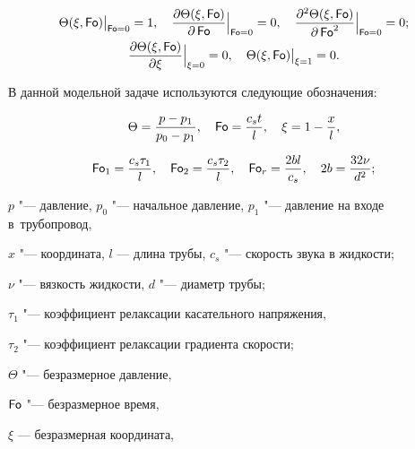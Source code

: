\begin{gather}

\label{kud:eq16}

\Theta(\xi , {\sf Fo})\big|_{\mathop{\sf Fo}=0}=1,

\quad

\frac{\partial  \Theta( \xi, \mathop{\sf Fo} )}{\partial \operatorname{\sf Fo}}\Big|_{\mathop{\sf Fo}=0}=0,

\quad

\frac{\partial^2 \Theta( \xi, \mathop{\sf Fo} )}{\partial \operatorname{\sf Fo}^2}\Big|_{\mathop{\sf Fo}= 0}=0;\\

\label{kud:eq17}

\frac{\partial  \Theta(\xi,\operatorname{\sf Fo})}{\partial  \xi}\Big|_{\xi=0}=0,

\quad

\Theta(\xi,\operatorname{\sf Fo})\big|_{\xi=1}=0.

\end{gather}

В данной модельной задаче используются следующие обозначения:

$$ \Theta=\frac{p-p_1 }{p_0 -p_1 },\quad 

\operatorname{\sf Fo}=\frac{c_st}l, \quad 

\xi=1-\frac{x}l, $$

$$

\operatorname{\sf Fo}_ 1 =\frac{c_s \tau_1 }l, \quad

\operatorname{\sf Fo}_{2} =\frac{c_s \tau_2 }{l},\quad 

\operatorname{\sf Fo}_r =\frac{2 b l}{c_s},\quad 

2b=\frac{32\nu}{d^2};

$$

$p$ "--- давление, $p_0 $ "--- начальное давление, $p_1 $ "--- давление на входе в~трубопровод, 

$x$ "--- координата, $l$ --- длина трубы, $c_s$ "--- скорость звука в жидкости; 

$\nu $ "--- вязкость жидкости, $d$ "--- диаметр трубы; 

$\tau_1$ "--- коэффициент релаксации касательного напряжения, 

$\tau_2$ "--- коэффициент релаксации градиента скорости;

$\Theta$ "--- безразмерное давление, 

$\operatorname{\sf Fo}$ "--- безразмерное время,

$\xi$ --- безразмерная координата,

